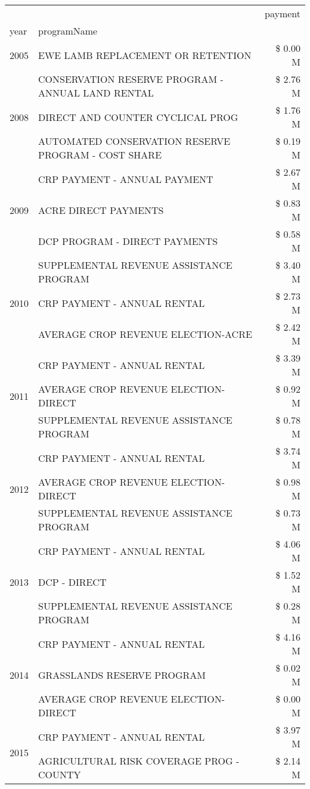 \begin{tabular}{llr}
\toprule
 &  & payment \\
year & programName &  \\
\midrule
2005 & EWE LAMB REPLACEMENT OR RETENTION & \$ 0.00 M \\
\cline{1-3}
\multirow[t]{3}{*}{2008} & CONSERVATION RESERVE PROGRAM - ANNUAL LAND RENTAL & \$ 2.76 M \\
 & DIRECT AND COUNTER CYCLICAL PROG & \$ 1.76 M \\
 & AUTOMATED CONSERVATION RESERVE PROGRAM - COST SHARE & \$ 0.19 M \\
\cline{1-3}
\multirow[t]{3}{*}{2009} & CRP PAYMENT - ANNUAL PAYMENT & \$ 2.67 M \\
 & ACRE DIRECT PAYMENTS & \$ 0.83 M \\
 & DCP PROGRAM - DIRECT PAYMENTS & \$ 0.58 M \\
\cline{1-3}
\multirow[t]{3}{*}{2010} & SUPPLEMENTAL REVENUE ASSISTANCE PROGRAM & \$ 3.40 M \\
 & CRP PAYMENT - ANNUAL RENTAL & \$ 2.73 M \\
 & AVERAGE CROP REVENUE ELECTION-ACRE & \$ 2.42 M \\
\cline{1-3}
\multirow[t]{3}{*}{2011} & CRP PAYMENT - ANNUAL RENTAL & \$ 3.39 M \\
 & AVERAGE CROP REVENUE ELECTION-DIRECT & \$ 0.92 M \\
 & SUPPLEMENTAL REVENUE ASSISTANCE PROGRAM & \$ 0.78 M \\
\cline{1-3}
\multirow[t]{3}{*}{2012} & CRP PAYMENT - ANNUAL RENTAL & \$ 3.74 M \\
 & AVERAGE CROP REVENUE ELECTION-DIRECT & \$ 0.98 M \\
 & SUPPLEMENTAL REVENUE ASSISTANCE PROGRAM & \$ 0.73 M \\
\cline{1-3}
\multirow[t]{3}{*}{2013} & CRP PAYMENT - ANNUAL RENTAL & \$ 4.06 M \\
 & DCP - DIRECT & \$ 1.52 M \\
 & SUPPLEMENTAL REVENUE ASSISTANCE PROGRAM & \$ 0.28 M \\
\cline{1-3}
\multirow[t]{3}{*}{2014} & CRP PAYMENT - ANNUAL RENTAL & \$ 4.16 M \\
 & GRASSLANDS RESERVE PROGRAM & \$ 0.02 M \\
 & AVERAGE CROP REVENUE ELECTION-DIRECT & \$ 0.00 M \\
\cline{1-3}
\multirow[t]{3}{*}{2015} & CRP PAYMENT - ANNUAL RENTAL & \$ 3.97 M \\
 & AGRICULTURAL RISK COVERAGE PROG - COUNTY & \$ 2.14 M \\

\end{tabular}
